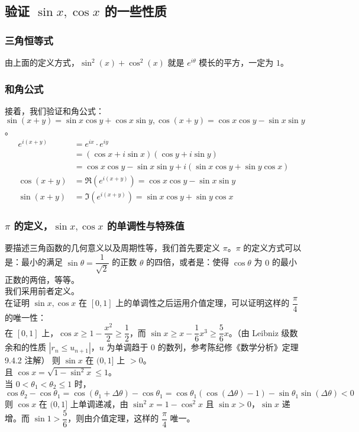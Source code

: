 \documentclass[UTF8,12pt]{ctexart}
\begin{document}
    \subsection{验证 $\sin x, \cos x$ 的一些性质}
        \subsubsection{三角恒等式}
            由上面的定义方式，$\sin^2(x) + \cos^2(x)$ 就是 $e^{i\theta}$ 模长的平方，一定为 $1$。
        \subsubsection{和角公式}
            接着，我们验证和角公式：$\sin(x + y) = \sin x\cos y + \cos x\sin y, \cos(x + y) = \cos x\cos y - \sin x\sin y$。\\
            $$
            \begin{aligned}
            e^{i(x + y)} &= e^{ix} \cdot e^{iy}\\
            &= (\cos x + i\sin x)(\cos y + i\sin y)\\
            &= \cos x\cos y - \sin x\sin y + i(\sin x\cos y + \sin y\cos x)\\
            \cos(x + y) &= \Re(e^{i(x + y)}) = \cos x\cos y - \sin x\sin y\\
            \sin(x + y) &= \Im(e^{i(x + y)}) = \sin x\cos y + \sin y\cos x
            \end{aligned}
            $$
        
        \subsubsection{$\pi$ 的定义，$\sin x, \cos x$ 的单调性与特殊值}
        要描述三角函数的几何意义以及周期性等，我们首先要定义 $\pi$。$\pi$ 的定义方式可以是：最小的满足 $\sin \theta = \dfrac{1}{\sqrt 2}$ 的正数 $\theta$ 的四倍，或者是：使得 $\cos \theta$ 为 $0$ 的最小正数的两倍，等等。\\
        
        我们采用前者定义。\\
        在证明 $\sin x, \cos x$ 在 $[0, 1]$ 上的单调性之后运用介值定理，可以证明这样的 $\dfrac{\pi}{4}$ 的唯一性：\\
        在 $[0, 1]$ 上，$\cos x \ge 1 - \dfrac{x^2}{2} \ge \dfrac 1 2$，而 $\sin x \ge x - \dfrac 1 6 x^3 \ge \dfrac 5 6 x$。（由 Leibniz 级数余和的性质 $|r_n \le u_{n + 1}|$，$u$ 为单调趋于 $0$ 的数列，参考陈纪修《数学分析》定理 9.4.2 注解）
        则 $\sin x$ 在 $(0, 1]$ 上 $> 0$。\\
        且 $\cos x = \sqrt{1 - \sin^2 x} \le 1$。\\
        当 $0 < \theta_1 < \theta_2 \le 1$ 时，$\cos \theta_2 - \cos \theta_1 = \cos(\theta_1 + \Delta \theta) - \cos\theta_1 = \cos \theta_1(\cos(\Delta \theta) - 1) - \sin \theta_1 \sin(\Delta \theta) < 0$\\
        则 $\cos x$ 在 $(0, 1]$ 上单调递减，由 $\sin^2 x = 1 - \cos^2 x$ 且 $\sin x > 0$，$\sin x$ 递增。而 $\sin 1 > \dfrac 5 6$，则由介值定理，这样的 $\dfrac{\pi}{4}$ 唯一。
        
\end{document}

